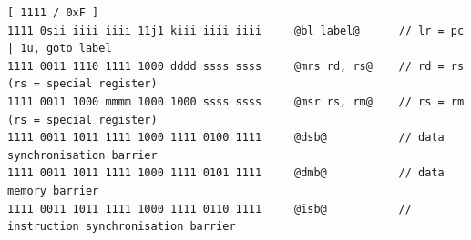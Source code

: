 \documentclass
[
    10pt,
    a4paper,
]
{article}
\begin{document}
\begin{lstlisting}[language=gnu-asm]
[ 1111 / 0xF ]
1111 0sii iiii iiii 11j1 kiii iiii iiii     @bl label@      // lr = pc | 1u, goto label
1111 0011 1110 1111 1000 dddd ssss ssss     @mrs rd, rs@    // rd = rs (rs = special register)
1111 0011 1000 mmmm 1000 1000 ssss ssss     @msr rs, rm@    // rs = rm (rs = special register)
1111 0011 1011 1111 1000 1111 0100 1111     @dsb@           // data synchronisation barrier
1111 0011 1011 1111 1000 1111 0101 1111     @dmb@           // data memory barrier
1111 0011 1011 1111 1000 1111 0110 1111     @isb@           // instruction synchronisation barrier
\end{lstlisting}
\end{document}
